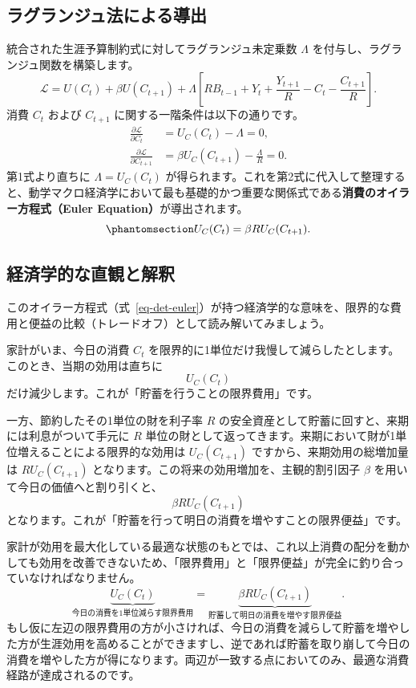 \documentclass[
  japanese,
  lualatex,
  ja=standard,
  12pt,
  a4paper]{ltjsarticle}
\begin{document}
\subsection{ラグランジュ法による導出}\label{ux30e9ux30b0ux30e9ux30f3ux30b8ux30e5ux6cd5ux306bux3088ux308bux5c0eux51fa}

統合された生涯予算制約式に対してラグランジュ未定乗数 \(\Lambda\)
を付与し、ラグランジュ関数を構築します。 \[
\mathcal{L} = U(C_t) + \beta U(C_{t+1}) + \Lambda \left[ R B_{t-1} + Y_t + \frac{Y_{t+1}}{R} - C_t - \frac{C_{t+1}}{R} \right].
\] 消費 \(C_t\) および \(C_{t+1}\) に関する一階条件は以下の通りです。 \[
\begin{aligned}
\frac{\partial \mathcal{L}}{\partial C_t} &= U_C(C_t) - \Lambda = 0,\\
\frac{\partial \mathcal{L}}{\partial C_{t+1}} &= \beta U_C(C_{t+1}) - \frac{\Lambda}{R} = 0.
\end{aligned}
\] 第1式より直ちに \(\Lambda = U_C(C_t)\)
が得られます。これを第2式に代入して整理すると、動学マクロ経済学において最も基礎的かつ重要な関係式である\textbf{消費のオイラー方程式（Euler
Equation）}が導出されます。
\begin{equation}\protect\phantomsection\label{eq-det-euler}{
U_C(C_t) = \beta R U_C(C_{t+1}).
}\end{equation}

\subsection{経済学的な直観と解釈}\label{ux7d4cux6e08ux5b66ux7684ux306aux76f4ux89b3ux3068ux89e3ux91c8}

このオイラー方程式（式~\ref{eq-det-euler}）が持つ経済学的な意味を、限界的な費用と便益の比較（トレードオフ）として読み解いてみましょう。

家計がいま、今日の消費 \(C_t\)
を限界的に1単位だけ我慢して減らしたとします。このとき、当期の効用は直ちに
\[
U_C(C_t)
\] だけ減少します。これが「貯蓄を行うことの限界費用」です。

一方、節約したその1単位の財を利子率 \(R\)
の安全資産として貯蓄に回すと、来期には利息がついて手元に \(R\)
単位の財として返ってきます。来期において財が1単位増えることによる限界的な効用は
\(U_C(C_{t+1})\) ですから、来期効用の総増加量は \(R U_C(C_{t+1})\)
となります。この将来の効用増加を、主観的割引因子 \(\beta\)
を用いて今日の価値へと割り引くと、 \[
\beta R U_C(C_{t+1})
\]
となります。これが「貯蓄を行って明日の消費を増やすことの限界便益」です。

家計が効用を最大化している最適な状態のもとでは、これ以上消費の配分を動かしても効用を改善できないため、「限界費用」と「限界便益」が完全に釣り合っていなければなりません。
\[
\underbrace{U_C(C_t)}_{\text{今日の消費を1単位減らす限界費用}} = \underbrace{\beta R U_C(C_{t+1})}_{\text{貯蓄して明日の消費を増やす限界便益}}.
\]
もし仮に左辺の限界費用の方が小さければ、今日の消費を減らして貯蓄を増やした方が生涯効用を高めることができますし、逆であれば貯蓄を取り崩して今日の消費を増やした方が得になります。両辺が一致する点においてのみ、最適な消費経路が達成されるのです。
\end{document}
